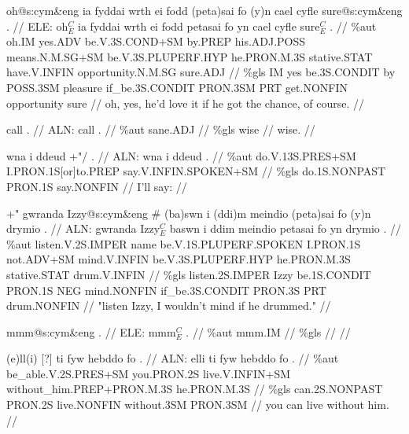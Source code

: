 \documentclass[a4paper,10pt]{article}
\begin{document}
\ex
\begingl[lingstyle=gergl]
\glchat oh@s:cym\&eng ia fyddai wrth ei fodd (peta)sai fo (y)n cael cyfle sure@s:cym\&eng . //
\glsurface ELE:  oh$^{C}_{E}$ ia fyddai wrth ei fodd petasai fo yn cael cyfle sure$^{C}_{E}$ .  //
\glauto \%aut  oh{\scriptsize .IM} yes{\scriptsize .ADV} be{\scriptsize .V.3S.COND+SM} by{\scriptsize .PREP} his{\scriptsize .ADJ.POSS} means{\scriptsize .N.M.SG+SM} be{\scriptsize .V.3S.PLUPERF.HYP} he{\scriptsize .PRON.M.3S} stative{\scriptsize .STAT} have{\scriptsize .V.INFIN} opportunity{\scriptsize .N.M.SG} sure{\scriptsize .ADJ}   //
\glmanual \%gls  IM yes be{\scriptsize .3S.CONDIT} by POSS{\scriptsize .3SM} pleasure if\_be{\scriptsize .3S.CONDIT} PRON{\scriptsize .3SM} PRT get{\scriptsize .NONFIN} opportunity sure   //
\gleng oh, yes, he'd love it if he got the chance, of course. //
\endgl
\xe

\ex
\begingl[lingstyle=gergl]
\glchat call . //
\glsurface ALN:  call .  //
\glauto \%aut  sane{\scriptsize .ADJ}   //
\glmanual \%gls  wise   //
\gleng wise. //
\endgl
\xe

\ex
\begingl[lingstyle=gergl]
\glchat wna i ddeud +"/ . //
\glsurface ALN:  wna i ddeud .  //
\glauto \%aut  do{\scriptsize .V.13S.PRES+SM} I{\scriptsize .PRON.1S[or]to.PREP} say{\scriptsize .V.INFIN.SPOKEN+SM}   //
\glmanual \%gls  do{\scriptsize .1S.NONPAST} PRON{\scriptsize .1S} say{\scriptsize .NONFIN}   //
\gleng I'll say: //
\endgl
\xe

\ex
\begingl[lingstyle=gergl]
\glchat +" gwranda Izzy@s:cym\&eng \# (ba)swn i (ddi)m meindio (peta)sai fo (y)n drymio . //
\glsurface ALN:  gwranda Izzy$^{C}_{E}$ baswn i ddim meindio petasai fo yn drymio .  //
\glauto \%aut  listen{\scriptsize .V.2S.IMPER} name be{\scriptsize .V.1S.PLUPERF.SPOKEN} I{\scriptsize .PRON.1S} not{\scriptsize .ADV+SM} mind{\scriptsize .V.INFIN} be{\scriptsize .V.3S.PLUPERF.HYP} he{\scriptsize .PRON.M.3S} stative{\scriptsize .STAT} drum{\scriptsize .V.INFIN}   //
\glmanual \%gls  listen{\scriptsize .2S.IMPER} Izzy be{\scriptsize .1S.CONDIT} PRON{\scriptsize .1S} NEG mind{\scriptsize .NONFIN} if\_be{\scriptsize .3S.CONDIT} PRON{\scriptsize .3S} PRT drum{\scriptsize .NONFIN}   //
\gleng "listen Izzy, I wouldn't mind if he drummed." //
\endgl
\xe

\ex
\begingl[lingstyle=gergl]
\glchat mmm@s:cym\&eng . //
\glsurface ELE:  mmm$^{C}_{E}$ .  //
\glauto \%aut  mmm{\scriptsize .IM}   //
\glmanual \%gls     //
\gleng  //
\endgl
\xe

\ex
\begingl[lingstyle=gergl]
\glchat (e)ll(i) [?] ti fyw hebddo fo . //
\glsurface ALN:  elli ti fyw hebddo fo .  //
\glauto \%aut  be\_able{\scriptsize .V.2S.PRES+SM} you{\scriptsize .PRON.2S} live{\scriptsize .V.INFIN+SM} without\_him{\scriptsize .PREP+PRON.M.3S} he{\scriptsize .PRON.M.3S}   //
\glmanual \%gls  can{\scriptsize .2S.NONPAST} PRON{\scriptsize .2S} live{\scriptsize .NONFIN} without{\scriptsize .3SM} PRON{\scriptsize .3SM}   //
\gleng you can live without him. //
\endgl
\xe
\end{document}
